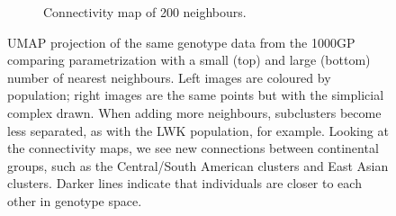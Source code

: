 \documentclass[12pt]{article}
\begin{document}
\begin{figure}[h!]
\begin{subfigure}[b]{0.48\linewidth}
    \caption{Connectivity map of 200 neighbours.}
    \label{fig:UMAP_high_NN_connectivity}
  \end{subfigure}
  \caption{UMAP projection of the same genotype data from the 1000GP comparing parametrization with a small (top) and large (bottom) number of nearest neighbours. Left images are coloured by population; right images are the same points but with the simplicial complex drawn. When adding more neighbours, subclusters become less separated, as with the LWK population, for example. Looking at the connectivity maps, we see new connections between continental groups, such as the Central/South American clusters and East Asian clusters. Darker lines indicate that individuals are closer to each other in genotype space.}
  \label{fig:UMAP_connectivity}
\end{figure}

\clearpage
\newpage




\end{document}
